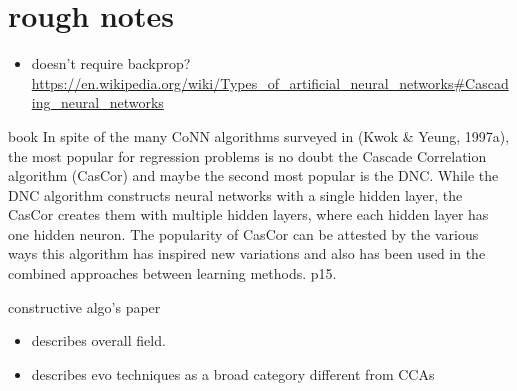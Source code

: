 \documentclass{beamer}
\begin{document}
\section{rough notes}
\label{sec:orgb0e1b95}
\begin{itemize}
\item doesn't require backprop? \url{https://en.wikipedia.org/wiki/Types\_of\_artificial\_neural\_networks\#Cascading\_neural\_networks}
\end{itemize}

\begin{frame}[label={sec:orgc434aa2}]{book}
In spite of the many CoNN algorithms surveyed in (Kwok \& Yeung, 1997a), the most popular for regression problems is no doubt the Cascade Correlation algorithm (CasCor) and maybe the second most popular is the DNC. While the DNC algorithm constructs neural networks with a single hidden layer, the CasCor creates them with multiple hidden layers, where each hidden layer has one hidden neuron. The popularity of CasCor can be attested by the various ways this algorithm has inspired new variations and also has been used in the combined approaches between learning methods. p15.
\end{frame}
\begin{frame}[label={sec:org52ba181}]{constructive algo's paper}
\begin{itemize}
\item describes overall field.
\item describes evo techniques as a broad category different from CCAs
\end{itemize}
\end{frame}
\end{document}

